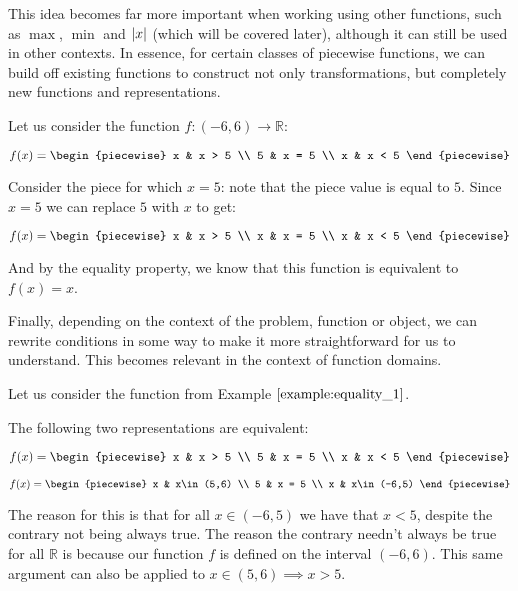 This idea becomes far more important when working using other functions, such as $\max$, $\min$ and $\abs{x}$ (which will be covered later), although it can still be used in other contexts. In essence, for certain classes of piecewise functions, we can build off existing functions to construct not only transformations, but completely new functions and representations.
\begin{example}
    \label{example:equality_1}
    Let us consider the function $f:(-6, 6)\to\mathbb{R}$:

    $$
        f(x) = \begin{piecewise}
            x & x > 5 \\
            5 & x = 5 \\
            x & x < 5
        \end{piecewise}
    $$

    Consider the piece for which $x=5$: note that the piece value is equal to $5$. Since $x=5$ we can replace $5$ with $x$ to get:

    $$
        f(x) = \begin{piecewise}
            x & x > 5 \\
            x & x = 5 \\
            x & x < 5
        \end{piecewise}
    $$

    And by the equality property, we know that this function is equivalent to $f(x)=x$.
\end{example}

Finally, depending on the context of the problem, function or object, we can rewrite conditions in some way to make it more straightforward for us to understand. This becomes relevant in the context of function domains.

\begin{example}
    Let us consider the function from Example $\ref{example:equality_1}$.

    The following two representations are equivalent:

    $$
        f(x) = \begin{piecewise}
            x & x > 5 \\
            5 & x = 5 \\
            x & x < 5
        \end{piecewise}
    $$

    $$
        f(x) = \begin{piecewise}
            x & x\in(5,6) \\
            5 & x = 5 \\
            x & x\in(-6,5)
        \end{piecewise}
    $$

    The reason for this is that for all $x\in(-6,5)$ we have that $x<5$, despite the contrary not being always true. The reason the contrary needn't always be true for all $\mathbb{R}$ is because our function $f$ is defined on the interval $(-6,6)$. This same argument can also be applied to $x\in(5,6)\implies x>5$.
\end{example}

